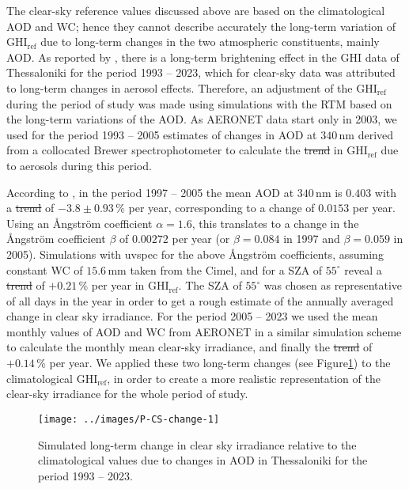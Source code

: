\documentclass[preprint, 5p,
authoryear]{elsarticle} %
\providecommand{\DIFaddtex}[1]{{\protect\color{blue}\uwave{#1}}} %
\providecommand{\DIFdeltex}[1]{{\protect\color{red}\sout{#1}}}                      %
\providecommand{\DIFaddbegin}{} %
\providecommand{\DIFaddend}{} %
\providecommand{\DIFdelbegin}{} %
\providecommand{\DIFdelend}{} %
\providecommand{\DIFadd}[1]{\texorpdfstring{\DIFaddtex{#1}}{#1}} %
\providecommand{\DIFdel}[1]{\texorpdfstring{\DIFdeltex{#1}}{}} %
\newcommand{\DIFscaledelfig}{0.5}
\newlength{\DIFdelgraphicswidth} %
\newlength{\DIFdelgraphicsheight} %
\newcommand{\DIFaddincludegraphics}[2][]{{\color{blue}\fbox{\DIFOincludegraphics[#1]{#2}}}} %
\newcommand{\DIFdelincludegraphics}[2][]{%
\sbox{\DIFdelgraphicsbox}{\DIFOincludegraphics[#1]{#2}}%
\settoboxwidth{\DIFdelgraphicswidth}{\DIFdelgraphicsbox} %
\settoboxtotalheight{\DIFdelgraphicsheight}{\DIFdelgraphicsbox} %
\scalebox{\DIFscaledelfig}{%
\parbox[b]{\DIFdelgraphicswidth}{\usebox{\DIFdelgraphicsbox}\\[-\baselineskip] \rule{\DIFdelgraphicswidth}{0em}}\llap{\resizebox{\DIFdelgraphicswidth}{\DIFdelgraphicsheight}{%
\setlength{\unitlength}{\DIFdelgraphicswidth}%
\begin{picture}(1,1)%
\thicklines\linethickness{2pt} %
{\color[rgb]{1,0,0}\put(0,0){\framebox(1,1){}}}%
{\color[rgb]{1,0,0}\put(0,0){\line( 1,1){1}}}%
{\color[rgb]{1,0,0}\put(0,1){\line(1,-1){1}}}%
\end{picture}%
}\hspace*{3pt}}} %
} %
\DeclareRobustCommand{\DIFaddbegin}{\DIFOaddbegin \let\includegraphics\DIFaddincludegraphics} %
\DeclareRobustCommand{\DIFaddend}{\DIFOaddend \let\includegraphics\DIFOincludegraphics} %
\DeclareRobustCommand{\DIFdelbegin}{\DIFOdelbegin \let\includegraphics\DIFdelincludegraphics} %
\DeclareRobustCommand{\DIFdelend}{\DIFOaddend \let\includegraphics\DIFOincludegraphics} %
\begin{document}
The clear-sky reference values discussed above are based on the
climatological AOD and WC; hence they cannot describe accurately the
long-term variation of \(\text{GHI}_\text{ref}\) due to long-term
changes in the two atmospheric constituents, mainly AOD. As reported by
\citet{Natsis2023}, there is a long-term brightening effect in the GHI
data of Thessaloniki for the period 1993 -- 2023, which for clear-sky
data was attributed to long-term changes in aerosol effects. Therefore,
an adjustment of the \(\text{GHI}_\text{ref}\) during the period of
study was made using simulations with the RTM based on the long-term
variations of the AOD. As AERONET data start only in 2003, we used for
the period 1993 -- 2005 estimates of changes in AOD at
\(340\,\text{nm}\) derived from a collocated Brewer spectrophotometer
\citep{Kazadzis2007} to calculate the \DIFdelbegin \DIFdel{trend }\DIFdelend \DIFaddbegin \DIFadd{change }\DIFaddend in
\(\text{GHI}_\text{ref}\) due to aerosols during this period.

According to \citet{Kazadzis2007}, in the period 1997 -- 2005 the mean
AOD at \(340\,\text{nm}\) is \(0.403\) with a \DIFdelbegin \DIFdel{trend }\DIFdelend \DIFaddbegin \DIFadd{change }\DIFaddend of
\(-3.8\pm0.93\,\%\) per year, corresponding to a change of \(0.0153\)
per year. Using an Ångström coefficient \(\alpha = 1.6\), this
translates to a change in the Ångström coefficient \(\beta\) of
\(0.00272\) per year (or \(\beta=0.084\) in 1997 and \(\beta=0.059\) in
2005). Simulations with uvspec for the above Ångström coefficients,
assuming constant WC of \(15.6\,\text{mm}\) taken from the Cimel, and
for a SZA of \(55^\circ\) reveal a \DIFdelbegin \DIFdel{trend }\DIFdelend \DIFaddbegin \DIFadd{change }\DIFaddend of \(+0.21\,\%\) per year in
\(\text{GHI}_\text{ref}\). The SZA of \(55^\circ\) was chosen as
representative of all days in the year in order to get a rough estimate
of the annually averaged change in clear sky irradiance. For the period
2005 -- 2023 we used the mean monthly values of AOD and WC from AERONET
in a similar simulation scheme to calculate the monthly mean clear-sky
irradiance, and finally the \DIFdelbegin \DIFdel{trend }\DIFdelend \DIFaddbegin \DIFadd{change }\DIFaddend of \(+0.14\,\%\) per year. We applied
these two long-term changes (see
Figure\nobreakspace{}\ref{fig:CS-change}) to the climatological
\(\text{GHI}_\text{ref}\), in order to create a more realistic
representation of the clear-sky irradiance for the whole period of
study.

\begin{figure}

{\centering \texttt{[image: ../images/P-CS-change-1]} 

}

\caption{Simulated long-term change in clear sky irradiance relative to the climatological values due to changes in AOD in Thessaloniki for the period 1993 -- 2023.}\label{fig:CS-change}
\end{figure}
\end{document}
